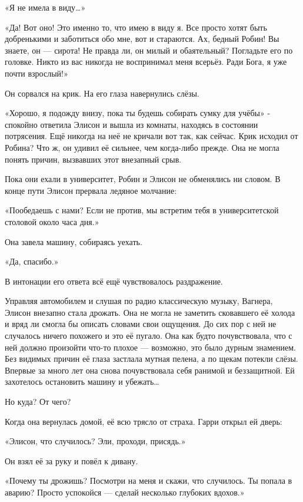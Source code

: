 \documentclass[a4paper,12pt]{book}
\begin{document}
«Я не имела в виду…»
\par
«Да! Вот оно! Это именно то, что имею в виду я. Все просто хотят быть добренькими и заботиться обо мне, вот и стараются. Ах, бедный Робин! Вы знаете, он — сирота! Не правда ли, он милый и обаятельный? Погладьте его по головке. Никто из вас никогда не воспринимал меня всерьёз. Ради Бога, я уже почти взрослый!»
\par
Он сорвался на крик. На его глаза навернулись слёзы.\\
\par
«Хорошо, я подожду внизу, пока ты будешь собирать сумку для учёбы» - спокойно ответила Элисон и вышла из комнаты, находясь в состоянии потрясения. Ещё никогда на неё не кричали вот так, как сейчас. Крик исходил от Робина? Что ж, он удивил её сильнее, чем когда-либо прежде. Она не могла понять причин, вызвавших этот внезапный срыв.\\
\par
Пока они ехали в университет, Робин и Элисон не обменялись ни словом. В конце пути Элисон прервала ледяное молчание:
\par
«Пообедаешь с нами? Если не против, мы встретим тебя в университетской столовой около часа дня.»
\par
Она завела машину, собираясь уехать.
\par
«Да, спасибо.»
\par
В интонации его ответа всё ещё чувствовалось раздражение.\\
\par
Управляя автомобилем и слушая по радио классическую музыку, Вагнера, Элисон внезапно стала дрожать. Она не могла не заметить сковавшего её холода и вряд ли смогла бы описать словами свои ощущения. До сих пор с ней не случалось ничего похожего и это её пугало. Она как будто почувствовала, что с ней должно произойти что-то плохое — возможно, это было дурным знамением. Без видимых причин её глаза застлала мутная пелена, а по щекам потекли слёзы. Впервые за много лет она снова почувствовала себя ранимой и беззащитной. Ей захотелось остановить машину и убежать…
\par
Но куда? От чего?\\
\par
Когда она вернулась домой, её всю трясло от страха. Гарри открыл ей дверь:
\par
«Элисон, что случилось? Эли, проходи, присядь.»
\par
Он взял её за руку и повёл к дивану.
\par
«Почему ты дрожишь? Посмотри на меня и скажи, что случилось. Ты попала в аварию? Просто успокойся — сделай несколько глубоких вдохов.»
\end{document}
